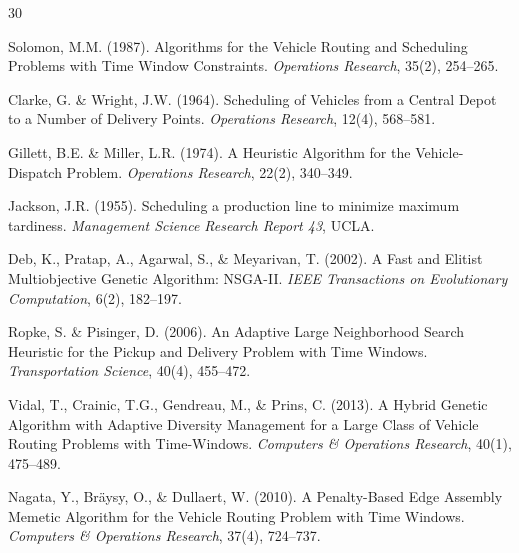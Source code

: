 \documentclass[11pt,a4paper]{article}
\begin{document}

\begin{thebibliography}{30}


 Solomon, M.M. (1987). Algorithms for the Vehicle Routing and
Scheduling Problems with Time Window Constraints. \textit{Operations Research},
35(2), 254--265.

 Clarke, G. \& Wright, J.W. (1964). Scheduling of Vehicles from a
Central Depot to a Number of Delivery Points. \textit{Operations Research}, 12(4),
568--581.

 Gillett, B.E. \& Miller, L.R. (1974). A Heuristic Algorithm for
the Vehicle-Dispatch Problem. \textit{Operations Research}, 22(2), 340--349.

 Jackson, J.R. (1955). Scheduling a production line to minimize
maximum tardiness. \textit{Management Science Research Report 43}, UCLA.


 Deb, K., Pratap, A., Agarwal, S., \& Meyarivan, T. (2002). A Fast
and Elitist Multiobjective Genetic Algorithm: NSGA-II.
\textit{IEEE Transactions on Evolutionary Computation}, 6(2), 182--197.

 Ropke, S. \& Pisinger, D. (2006). An Adaptive Large Neighborhood
Search Heuristic for the Pickup and Delivery Problem with Time Windows.
\textit{Transportation Science}, 40(4), 455--472.

 Vidal, T., Crainic, T.G., Gendreau, M., \& Prins, C. (2013). A
Hybrid Genetic Algorithm with Adaptive Diversity Management for a Large Class of
Vehicle Routing Problems with Time-Windows. \textit{Computers \& Operations Research},
40(1), 475--489.

 Nagata, Y., Br\"{a}ysy, O., \& Dullaert, W. (2010). A
Penalty-Based Edge Assembly Memetic Algorithm for the Vehicle Routing Problem with
Time Windows. \textit{Computers \& Operations Research}, 37(4), 724--737.


\end{thebibliography}
\end{document}
